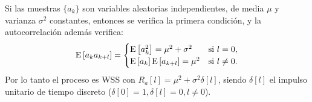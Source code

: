 \begin{ejemplo}\label{ej:iid}
    Si las muestras $\{a_k\}$ son variables aleatorias independientes, de media $\mu$ y varianza $\sigma^2$ constantes, entonces se verifica la primera condición, y la autocorrelación además verifica:
    \begin{equation*}
        \mathrm{E}\left[a_k a_{k+l}\right] = \begin{cases}
        \mathrm{E}\left[a_k^2\right] = \mu^2 + \sigma^2 & \text{si }l=0, \\
        \mathrm{E}\left[a_k\right]\mathrm{E}\left[a_{k+l}\right] = \mu^2 & \text{si }l\neq 0.
        \end{cases}
    \end{equation*}
    Por lo tanto el proceso es WSS con $R_a[l] = \mu^2 + \sigma^2 \delta[l]$, siendo $\delta[l]$ el impulso unitario de tiempo discreto ($\delta[0]=1,\delta[l]=0, l\neq0$).

    \begin{center}
    \end{center}
\end{ejemplo}

